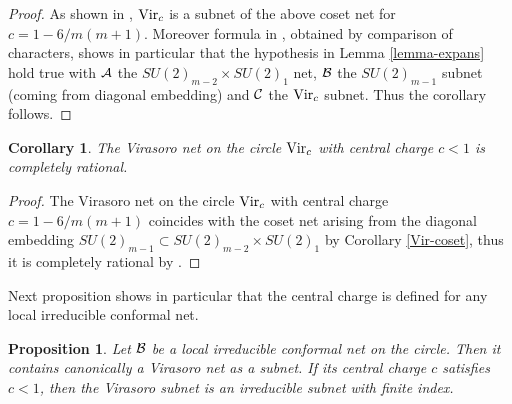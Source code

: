 \documentclass[12pt]{article}
\def\Vir{{\rm Vir}}
\newtheorem{corollary}[theorem]{Corollary}
\newtheorem{proposition}[theorem]{Proposition}
\def\A{{\cal A}}
\def\B{{\cal B}}
\def\CC{{\cal C}}
\def\M{{\cal B}}
\begin{document}
\begin{proof}
As shown in \cite{GKO}, $\Vir_c$ is a subnet of the above coset net for
$c=1-6/m(m+1)$. Moreover formula in  \cite[(2.20)]{GKO},
obtained by comparison of 
characters, shows in particular that the hypothesis in Lemma 
\ref{lemma-expans} hold true with $\A$ the $SU(2)_{m-2}\times SU(2)_1$ net,
$\B$ the $SU(2)_{m-1}$ subnet (coming from diagonal embedding) and 
$\CC$ the $\Vir_c$ subnet. Thus the corollary follows.
\end{proof}

\begin{corollary}
\label{coset-rat}
The Virasoro net on the circle $\Vir_c$ with central charge $c<1$
is completely rational.
\end{corollary}

\begin{proof}
The Virasoro net on the circle $\Vir_c$ with central charge $c=1-6/m(m+1)$
coincides with the coset net arising from the diagonal
embedding $SU(2)_{m-1}\subset SU(2)_{m-2}\times SU(2)_1$ by
Corollary \ref{Vir-coset}, thus it is completely rational by
\cite[Sect. 3.5.1]{L4}.
\end{proof}
Next proposition shows in particular that the central charge is 
defined for any local irreducible conformal net.

\begin{proposition}
\label{Vir-sub}
Let $\M$ be a local irreducible conformal net on the circle.
Then it contains canonically a Virasoro net as a subnet.  If its central
charge $c$ satisfies $c<1$, then the Virasoro subnet is an irreducible 
subnet with finite index.
\end{proposition}
\end{document}
